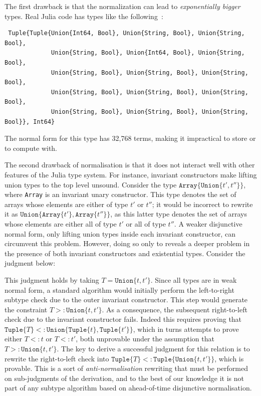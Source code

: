 \documentclass[a4paper,english]{lipics-v2019}
\newcommand{\xt}[1]{\texttt{#1}}
\newcommand{\union}[2]{\xt{Union\{}#1,#2\xt{\}}}
\newcommand{\tuple}[1]{\xt{Tuple\{}#1\xt{\}}}
\newcommand{\arrayt}[1]{\xt{Array\{}#1\xt{\}}}
\begin{document}
The first drawback is that the normalization can lead to \emph{exponentially
bigger} types. Real Julia code has types like the following~\cite{DBLP:NardelliBPCBV18}:

\begin{small}
\begin{verbatim}
 Tuple{Tuple{Union{Int64, Bool}, Union{String, Bool}, Union{String, Bool}, 
             Union{String, Bool}, Union{Int64, Bool}, Union{String, Bool}, 
             Union{String, Bool}, Union{String, Bool}, Union{String, Bool}, 
             Union{String, Bool}, Union{String, Bool}, Union{String, Bool}, 
             Union{String, Bool}, Union{String, Bool}, Union{String, Bool}}, Int64}
\end{verbatim}
\end{small}

\noindent The normal form for this type has 32,768 terms, making it impractical
to store or to compute with.

The second drawback of normalisation is that it does not interact well with
other features of the Julia type system. For instance, invariant constructors
make lifting union types to the top level unsound. Consider the type {\small
\(\arrayt{\union{t'}{t''}}\)}, where {\small   \texttt{Array}} is an invariant
unary constructor.  This type denotes the set of arrays whose elements are
either of type {\small $t'$} or {\small   $t''$}; it would be incorrect to
rewrite it as {\small \(\union{\arrayt{t'}}{\arrayt{t''}}\)}, as this latter
type denotes the set of arrays whose elements are either all of type {\small
$t'$} or all of type {\small$t''$}.  A weaker disjunctive normal form, only
lifting union types inside each invariant constructor, can circumvent this
problem. However, doing so only to reveals a deeper problem in the presence of
both invariant constructors and {existential types}.  Consider the judgment
below:

%
\vspace{-3mm}{\small\[
  \arrayt{\union{\tuple{t}}{\tuple{t'}}} \ \ <:\ \ \exists T\,.\, \arrayt{\tuple{T}}
\]}\vspace{-3mm}
%

\noindent  This judgment holds by taking {\small$T=\union{t}{t'}$}.
Since all types are in weak normal form, a standard algorithm would
initially perform the left-to-right subtype check due to the outer invariant
constructor.  This step would generate the constraint
{\small$T>:\union{t}{t'}$}.  As a consequence, the subsequent right-to-left
check due to the invariant constructor fails.  Indeed this requires proving
that {\small$\tuple{T}<:\union{\tuple{t}}{\tuple{t'}}$}, which in turns
attempts to prove either {\small$T<:t$} or {\small$T<:t'$}, both unprovable
under the assumption that {\small$T>:\union{t}{t'}$}. The key to derive a
successful judgment for this relation is to rewrite the right-to-left check
into {\small$\tuple{T}<:\tuple{\union{t}{t'}}$}, which is provable. This is
a sort of \emph{anti-normalisation} rewriting that must be performed on
sub-judgments of the derivation, and to the best of our knowledge it is not
part of any subtype algorithm based on ahead-of-time disjunctive
normalisation.
\end{document}

